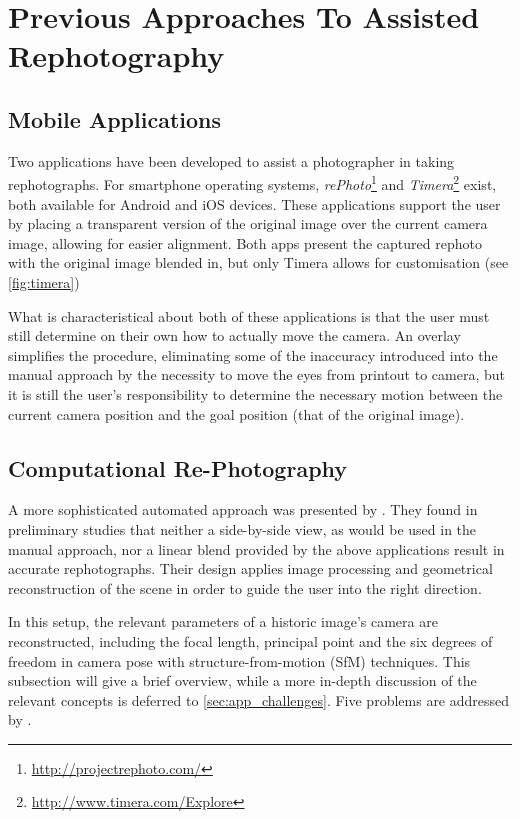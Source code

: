 \section{Previous Approaches To Assisted Rephotography}

\subsection{Mobile Applications}\label{subsec:mobile_apps}

Two applications have been developed to assist a photographer in taking
rephotographs. For smartphone operating systems,
\emph{rePhoto}\footnote{\url{http://projectrephoto.com/}} and
\emph{Timera}\footnote{\url{http://www.timera.com/Explore}} exist, both
available for Android and iOS devices. These applications support the user by placing a transparent
version of the original image over the current camera image, allowing for easier
alignment. 
Both apps present the captured rephoto with the original image blended in, but
only Timera allows for customisation (see \autoref{fig:timera})

What is characteristical about both of these applications is that the user must still
determine on their own how to actually move the camera. An overlay simplifies
the procedure, eliminating some of the inaccuracy introduced into the manual approach by the
necessity to move the eyes from printout to camera, but it is still the user's
responsibility to determine the necessary motion between the current camera
position and the goal position (that of the original image). 

\subsection{Computational Re-Photography}

A more sophisticated automated approach was presented by \citet{bae2010}. They
found in preliminary studies that neither a side-by-side view, as would be used
in the manual approach, nor a linear blend provided by the above applications
result in accurate rephotographs. Their design applies image processing and
geometrical reconstruction of the scene in order to guide the user into the right direction.

In this setup, the relevant parameters of a historic image's camera are
reconstructed, including the focal length, principal point and the six degrees
of freedom in camera pose with structure-from-motion (SfM) techniques. This
subsection will give a brief overview, while a more in-depth discussion of the
relevant concepts is deferred to \autoref{sec:app_challenges}. Five problems
are addressed by \citet{bae2010}.

